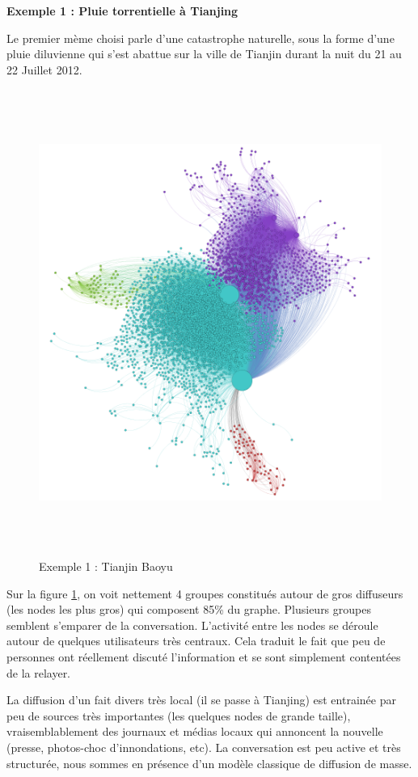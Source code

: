 \textbf{Exemple 1 : Pluie torrentielle à Tianjing}

Le premier mème choisi parle d{\textquoteright}une catastrophe naturelle, sous la forme d{\textquoteright}une pluie diluvienne qui s{\textquoteright}est abattue sur la ville de Tianjin durant la nuit du 21 au 22 Juillet 2012.

\begin{figure}[htbp]
    \centering
    \includegraphics[width=6in,height=6in]{figures/chap3/chapitre3-img17.png}
    \caption{Exemple 1 : Tianjin Baoyu}
    \label{fig:graph-tianjin}
\end{figure}

Sur la figure \ref{fig:graph-tianjin}, on voit nettement 4 groupes constitués autour de gros diffuseurs (les nodes les plus gros) qui composent 85\% du graphe. Plusieurs groupes semblent s{\textquoteright}emparer de la conversation. L'activité entre les nodes se déroule autour de quelques utilisateurs très centraux. Cela traduit le fait que peu de personnes ont réellement discuté l{\textquoteright}information et se sont simplement contentées de la relayer.


La diffusion d{\textquoteright}un fait divers très local (il se passe à Tianjing) est entrainée par peu de sources très importantes (les quelques nodes de grande taille), vraisemblablement des journaux et médias locaux qui annoncent la nouvelle (presse, photos-choc d{\textquoteright}innondations, etc). La conversation est peu active et très structurée, nous sommes en présence d{\textquoteright}un modèle classique de diffusion de masse.


